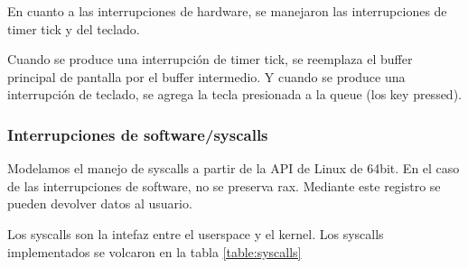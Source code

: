 \documentclass{article}
\begin{document}
En cuanto a las interrupciones de hardware, se manejaron las interrupciones de timer tick y del teclado.

Cuando se produce una interrupción de timer tick, se reemplaza el buffer principal de pantalla por el buffer intermedio. Y cuando se produce una interrupción de teclado, se agrega la tecla presionada a la queue (los key pressed).

\subsubsection {Interrupciones de software/syscalls}

Modelamos el manejo de syscalls a partir de la API de Linux de 64bit. En el caso de las interrupciones de software, no se preserva rax. Mediante este registro se pueden devolver datos al usuario.

Los syscalls son la intefaz entre el userspace y el kernel. Los syscalls implementados se volcaron en la tabla \ref{table:syscalls}
\end{document}
